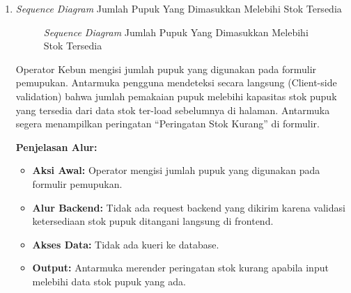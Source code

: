 \documentclass[a4paper,11pt]{article}
\begin{document}
\begin{enumerate}
    \textbf{Penjelasan Alur:}
    \begin{itemize}
        \item \textbf{Aksi Awal:} Operator mengisi formulir dengan data tidak lengkap atau format salah dan menekan \textbf{Simpan}.
        \item \textbf{Alur Backend:} Request dikirim ke handler. Handler memvalidasi data dan mendeteksi kolom wajib yang tidak terisi.
        \item \textbf{Akses Data:} Request dihentikan di layer handler, tidak ada kueri ke database.
        \item \textbf{Output:} Handler mengembalikan status \texttt{HTTP 400} dan antarmuka menampilkan pesan ``Pencatatan gagal, periksa kembali data yang dimasukkan''.
    \end{itemize}

    \item \textit{Sequence Diagram} Jumlah Pupuk Yang Dimasukkan Melebihi Stok Tersedia
    \begin{figure}[H]
        \centering
        \caption{\textit{Sequence Diagram} Jumlah Pupuk Yang Dimasukkan Melebihi Stok Tersedia}
        \label{fig:sd-pemupukan-stok-kurang}
    \end{figure}

    \hspace{1em} Operator Kebun mengisi jumlah pupuk yang digunakan pada formulir pemupukan. Antarmuka pengguna mendeteksi secara langsung (Client-side validation) bahwa jumlah pemakaian pupuk melebihi kapasitas stok pupuk yang tersedia dari data stok ter-load sebelumnya di halaman. Antarmuka segera menampilkan peringatan ``Peringatan Stok Kurang'' di formulir.

    \textbf{Penjelasan Alur:}
    \begin{itemize}
        \item \textbf{Aksi Awal:} Operator mengisi jumlah pupuk yang digunakan pada formulir pemupukan.
        \item \textbf{Alur Backend:} Tidak ada request backend yang dikirim karena validasi ketersediaan stok pupuk ditangani langsung di frontend.
        \item \textbf{Akses Data:} Tidak ada kueri ke database.
        \item \textbf{Output:} Antarmuka merender peringatan stok kurang apabila input melebihi data stok pupuk yang ada.
    \end{itemize}


\end{enumerate}
\end{document}
